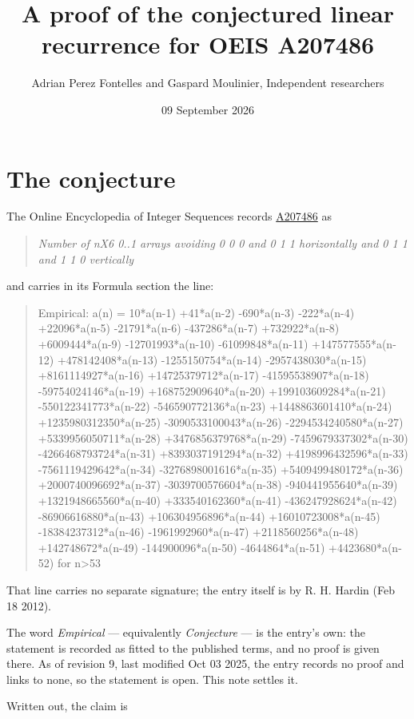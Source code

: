 \documentclass[11pt]{article}
\title{A proof of the conjectured linear recurrence for OEIS A207486}
\author{Adrian Perez Fontelles and Gaspard Moulinier, Independent researchers}
\date{09 September 2026}
\theoremstyle{definition}
\begin{document}
\maketitle
\section{The conjecture}

The Online Encyclopedia of Integer Sequences records \href{https://oeis.org/A207486}{A207486} as

\begin{quote}\itshape Number of nX6 0..1 arrays avoiding 0 0 0 and 0 1 1 horizontally and 0 1 1 and 1 1 0 vertically\end{quote}

and carries in its Formula section the line:

\begin{quote}\ttfamily Empirical: a(n) = 10*a(n-1) +41*a(n-2) -690*a(n-3) -222*a(n-4) +22096*a(n-5) -21791*a(n-6) -437286*a(n-7) +732922*a(n-8) +6009444*a(n-9) -12701993*a(n-10) -61099848*a(n-11) +147577555*a(n-12) +478142408*a(n-13) -1255150754*a(n-14) -2957438030*a(n-15) +8161114927*a(n-16) +14725379712*a(n-17) -41595538907*a(n-18) -59754024146*a(n-19) +168752909640*a(n-20) +199103609284*a(n-21) -550122341773*a(n-22) -546590772136*a(n-23) +1448863601410*a(n-24) +1235980312350*a(n-25) -3090533100043*a(n-26) -2294534240580*a(n-27) +5339956050711*a(n-28) +3476856379768*a(n-29) -7459679337302*a(n-30) -4266468793724*a(n-31) +8393037191294*a(n-32) +4198996432596*a(n-33) -7561119429642*a(n-34) -3276898001616*a(n-35) +5409499480172*a(n-36) +2000740096692*a(n-37) -3039700576604*a(n-38) -940441955640*a(n-39) +1321948665560*a(n-40) +333540162360*a(n-41) -436247928624*a(n-42) -86906616880*a(n-43) +106304956896*a(n-44) +16010723008*a(n-45) -18384237312*a(n-46) -1961992960*a(n-47) +2118560256*a(n-48) +142748672*a(n-49) -144900096*a(n-50) -4644864*a(n-51) +4423680*a(n-52) for n>53\end{quote}

That line carries no separate signature; the entry itself is by R. H. Hardin (Feb 18 2012).

The word {\itshape Empirical} --- equivalently {\itshape Conjecture} --- is the entry's own: the statement is recorded as fitted to the published terms, and no proof is given there. As of revision 9, last modified Oct 03 2025, the entry records no proof and links to none, so the statement is open. This note settles it.

Written out, the claim is
\end{document}
